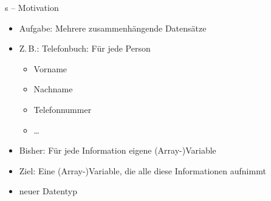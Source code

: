 
\begin{frame}{s -- Motivation}
%
\begin{itemize}
\item Aufgabe: Mehrere zusammenhängende Datensätze
\item Z.\,B.: Telefonbuch: Für jede Person
	\begin{itemize}
	\item Vorname
	\item Nachname
	\item Telefonnummer
	\item \ldots
	\end{itemize}
\item Bisher: Für jede Information eigene (Array-)Variable
\item Ziel: Eine (Array-)Variable, die alle diese Informationen aufnimmt
\item[\Thus] neuer Datentyp
\end{itemize}
%
\end{frame}


